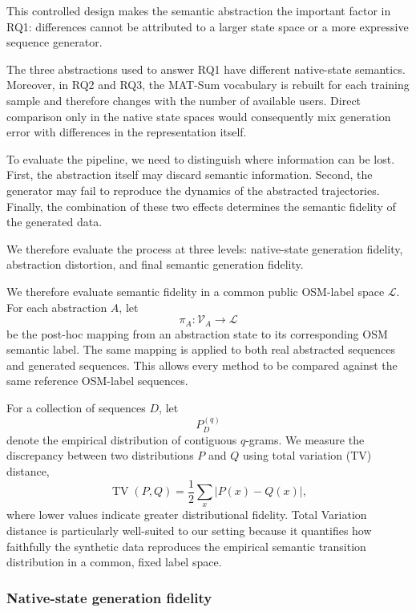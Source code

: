 \documentclass[sigconf,nonacm]{acmart}
\begin{document}
This controlled design makes the semantic abstraction the important factor in RQ1: differences cannot be attributed to a larger state space or a more expressive sequence generator.


The three abstractions used to answer RQ1 have different native-state semantics. Moreover, in RQ2 and RQ3, the MAT-Sum vocabulary is rebuilt for each training sample and therefore changes with the number of available users. Direct comparison only in the native state spaces would consequently mix generation error with differences in the representation itself.

To evaluate the pipeline, we need to distinguish where information can be lost. First, the abstraction itself may discard semantic information. Second, the generator may fail to reproduce the dynamics of the abstracted trajectories. Finally, the combination of these two effects determines the semantic fidelity of the generated data.

We therefore evaluate the process at three levels: native-state generation fidelity, abstraction distortion, and final semantic generation fidelity.

We therefore evaluate semantic fidelity in a common public OSM-label space $\mathcal{L}$. For each abstraction $A$, let
%
\[
    \pi_A :
    \mathcal{V}_A \rightarrow \mathcal{L}
\]
%
be the post-hoc mapping from an abstraction state to its corresponding OSM semantic label. The same mapping is applied to both real abstracted sequences and generated sequences. This allows every method to be compared against the same reference OSM-label sequences.

For a collection of sequences $D$, let
%
\[
    P_D^{(q)}
\]
%
denote the empirical distribution of contiguous $q$-grams. We measure the discrepancy between two distributions $P$ and $Q$ using total variation (TV) distance,
%
\[
    \operatorname{TV}(P,Q)
    =
    \frac{1}{2}
    \sum_x |P(x)-Q(x)|,
\]
%
where lower values indicate greater distributional fidelity.
Total Variation distance is particularly well-suited to our setting because it quantifies how faithfully the synthetic data reproduces the empirical semantic transition distribution in a common, fixed label space.

\subsubsection{Native-state generation fidelity}
\end{document}
